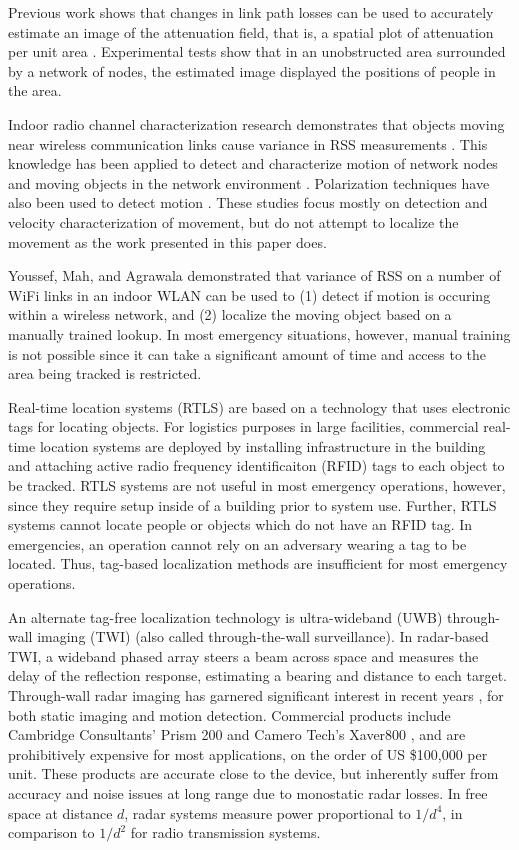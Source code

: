\documentclass[journal]{IEEEtran}
\begin{document}
Previous work shows that changes in link path losses can be used to accurately estimate an image of the attenuation field, that is, a spatial plot of attenuation per unit area \cite{Wilson09a}.  Experimental tests show that in an unobstructed area surrounded by a network of nodes, the estimated image displayed the positions of people in the area.

Indoor radio channel characterization research demonstrates that objects moving near wireless communication links cause variance in RSS measurements \cite{Bultitude87}. This knowledge has been applied to detect and characterize motion of network nodes and moving objects in the network environment \cite{Woyach06}. Polarization techniques have also been used to detect motion \cite{Pratt08}. These studies focus mostly on detection and velocity characterization of movement, but do not attempt to localize the movement as the work presented in this paper does.

Youssef, Mah, and Agrawala \cite{Youssef07} demonstrated that variance of RSS on a number of WiFi links in an indoor WLAN can be used to (1) detect if motion is occuring within a wireless network, and (2) localize the moving object based on a manually trained lookup. In most emergency situations, however, manual training is not possible since it can take a significant amount of time and access to the area being tracked is restricted.

Real-time location systems (RTLS) are based on a technology that uses electronic tags for locating objects. For logistics purposes in large facilities, commercial real-time location systems are deployed by installing infrastructure in the building and attaching active radio frequency identificaiton (RFID) tags to each object to be tracked. RTLS systems are not useful in most emergency operations, however, since they require setup inside of a building prior to system use.  Further, RTLS systems cannot locate people or objects which do not have an RFID tag.  In emergencies, an operation cannot rely on an adversary wearing a tag to be located.  Thus, tag-based localization methods are insufficient for most emergency operations.

An alternate tag-free localization technology is ultra-wideband (UWB) through-wall imaging (TWI) (also called through-the-wall surveillance).  In radar-based TWI, a wideband phased array steers a beam across space and measures the delay of the reflection response, estimating a bearing and distance to each target. Through-wall radar imaging has garnered significant interest in recent years  \cite{Aryanfar04,Lin05,Lin06,Song05,Vertiy04}, for both static imaging and motion detection. Commercial products include Cambridge Consultants' Prism 200 \cite{Cambridge} and Camero Tech's Xaver800 \cite{Camero}, and are prohibitively expensive for most applications, on the order of US \$100,000 per unit. These products are accurate close to the device, but inherently suffer from accuracy and noise issues at long range due to monostatic radar losses.  In free space at distance $d$, radar systems measure power proportional to $1/d^4$, in comparison to  $1/d^2$ for radio transmission systems.
\end{document}
